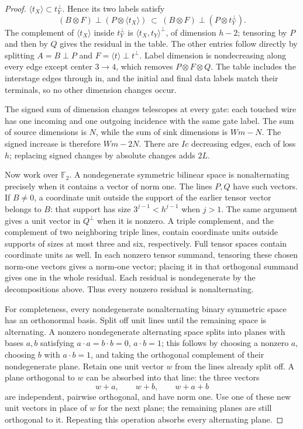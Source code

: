\documentclass[11pt]{article}
\theoremstyle{definition}
\begin{document}
\begin{proof}
$\langle t_X\rangle\subset t_Y^\perp$.  Hence its two labels satisfy
\[
 (B\otimes F)\mathbin{\perp}(P\otimes\langle t_X\rangle)
 \ \subset\
 (B\otimes F)\mathbin{\perp}(P\otimes t_Y^\perp).
\]
The complement of $\langle t_X\rangle$ inside $t_Y^\perp$ is
$\langle t_X,t_Y\rangle^\perp$, of dimension $h-2$; tensoring by
$P$ and then by $Q$ gives the residual in the table.  The other entries
follow directly by splitting $A=B\mathbin{\perp}P$ and
$F=\langle t\rangle\mathbin{\perp}t^\perp$.
Label dimension is nondecreasing along every edge except center $3\to4$, which removes
$P\otimes F\otimes Q$.  The table includes the interstage edges through
$\mathrm{in}$, and the initial and final data labels match their terminals,
so no other dimension changes occur.

The signed sum of dimension changes telescopes at every gate: each
touched wire has one incoming and one outgoing incidence with the same
gate label.  The sum of source dimensions is $N$, while the sum of
sink dimensions is $Wm-N$.  The signed increase is therefore $Wm-2N$.
There are $Ic$ decreasing edges, each of loss $h$; replacing signed
changes by absolute changes adds $2L$.

Now work over $\mathbb F_2$.  A nondegenerate symmetric bilinear space
is nonalternating precisely when it contains a vector of norm one.
The lines $P,Q$ have such vectors.  If $B\ne0$, a coordinate unit
outside the support of the earlier tensor vector belongs to $B$:
that support has size $3^{j-1}<h^{j-1}$ when $j>1$.
The same argument gives a unit vector in $Q^\perp$ when it is nonzero.
A triple complement, and the complement of two neighboring triple
lines, contain coordinate units outside supports of sizes at most
three and six, respectively.  Full tensor spaces contain coordinate
units as well.  In each nonzero tensor summand, tensoring these chosen
norm-one vectors gives a norm-one vector; placing it in that orthogonal
summand gives one in the whole residual.  Each residual is nondegenerate
by the decompositions above.  Thus every nonzero residual is nonalternating.

For completeness, every nondegenerate nonalternating binary symmetric
space has an orthonormal basis.  Split off unit lines until the
remaining space is alternating.  A nonzero nondegenerate alternating
space splits into planes with bases $a,b$ satisfying
$a\cdot a=b\cdot b=0$, $a\cdot b=1$; this follows by choosing a
nonzero $a$, choosing $b$ with $a\cdot b=1$, and taking the orthogonal
complement of their nondegenerate plane.  Retain one unit vector $w$
from the lines already split off.  A plane orthogonal to $w$ can be
absorbed into that line: the three vectors
\[
 w+a,\qquad w+b,\qquad w+a+b
\]
are independent, pairwise orthogonal, and have norm one.
Use one of these new unit vectors in place of $w$ for the next plane;
the remaining planes are still orthogonal to it.  Repeating this
operation absorbs every alternating plane.
\end{proof}
\end{document}
